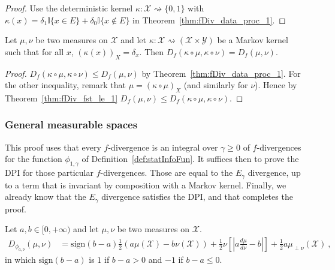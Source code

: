 \begin{proof}
Use the deterministic kernel $\kappa : \mathcal X \rightsquigarrow \{0, 1\}$ with $\kappa(x) = \delta_1 \mathbb{I}\{x \in E\} + \delta_0 \mathbb{I}\{x \notin E\}$ in Theorem~\ref{thm:fDiv_data_proc_1}.
\end{proof}

\begin{lemma}
  \label{lem:fDiv_compProd_prod_eq}
  Let $\mu, \nu$ be two measures on $\mathcal X$ and let $\kappa : \mathcal X \rightsquigarrow (\mathcal X \times \mathcal Y)$ be a Markov kernel such that for all $x$, $(\kappa(x))_X = \delta_x$. Then $D_f(\kappa \circ \mu, \kappa \circ \nu) = D_f(\mu, \nu)$.
\end{lemma}

\begin{proof}
$D_f(\kappa \circ \mu, \kappa \circ \nu) \le D_f(\mu, \nu)$ by Theorem~\ref{thm:fDiv_data_proc_1}.
For the other inequality, remark that $\mu = (\kappa \circ \mu)_X$ (and similarly for $\nu$). Hence by Theorem~\ref{thm:fDiv_fst_le_1} $D_f(\mu, \nu) \le D_f(\kappa \circ \mu, \kappa \circ \nu)$.
\end{proof}




\subsubsection{General measurable spaces}

This proof uses that every $f$-divergence is an integral over $\gamma \ge 0$ of $f$-divergences for the function $\phi_{1,\gamma}$ of Definition~\ref{def:statInfoFun}. It suffices then to prove the DPI for those particular $f$-divergences. Those are equal to the $E_\gamma$ divergence, up to a term that is invariant by composition with a Markov kernel. Finally, we already know that the $E_\gamma$ divergence satisfies the DPI, and that completes the proof.

\begin{lemma}
  \label{lem:fDiv_statInfoFun_eq}
  \leanok
  Let $a,b \in [0, +\infty)$ and let $\mu, \nu$ be two measures on $\mathcal X$.
  \begin{align*}
  D_{\phi_{a,b}}(\mu, \nu)
  &= \text{sign}(b-a)\frac{1}{2}(a \mu(\mathcal X) - b \nu(\mathcal X)) + \frac{1}{2}\nu\left[ \left\vert a \frac{d\mu}{d\nu} - b \right\vert \right] + \frac{1}{2}a \mu_{\perp \nu}(\mathcal X)
  \: ,
  \end{align*}
  in which $\text{sign}(b-a)$ is $1$ if $b-a > 0$ and $-1$ if $b-a \le 0$.
\end{lemma}


